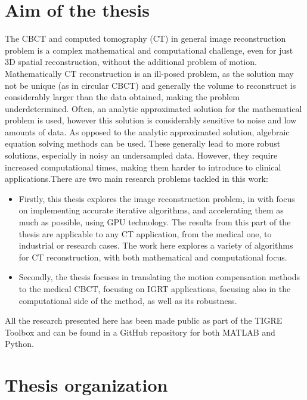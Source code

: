 
\section{Aim of the thesis}

The CBCT and computed tomography (CT) in general image reconstruction problem is a complex mathematical and computational challenge, even for just 3D spatial reconstruction, without the additional problem of motion. Mathematically CT reconstruction is an ill-posed problem, as the solution may not be unique (as in circular CBCT) and generally the volume to reconstruct is considerably larger than the  data obtained, making the problem underdetermined. Often, an analytic approximated solution for the  mathematical problem is used, however this solution is considerably sensitive to noise and low amounts of data. As opposed to the analytic approximated solution, algebraic equation solving methods can be used. These generally lead to more robust solutions, especially in noisy an undersampled data. However, they require increased computational times, making them harder to introduce to clinical applications.There are two main research problems tackled in this work:

\begin{itemize}
\item Firstly, this thesis explores the image reconstruction problem, in with focus on implementing accurate iterative algorithms, and accelerating them as much as possible, using GPU technology. The results from this part of the thesis are applicable to any CT application, from the medical one, to industrial or research cases. The work here explores a variety of algorithms for CT reconstruction, with both mathematical and computational focus.
\item Secondly, the thesis focuses in translating the motion compensation methods to the medical CBCT, focusing on IGRT applications, focusing also in the computational side of the method, as well as its robustness.
\end{itemize}

All the research presented here has been made public as part of the TIGRE Toolbox\cite{TIGRE} and can be found in a GitHub repository\cite{TIGREweb} for both MATLAB and Python. 

\section{Thesis organization}

